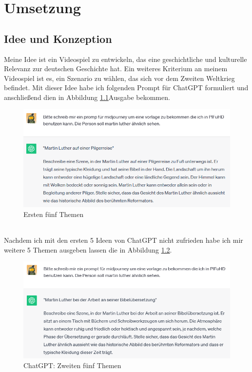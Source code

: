 \chapter{Umsetzung}
\section {Idee und Konzeption}
Meine Idee ist ein Videospiel zu entwickeln, das eine geschichtliche und kulturelle Relevanz zur deutschen Geschichte hat. Ein weiteres Kriterium an meinem Videospiel ist es, ein Szenario zu wählen, das sich vor dem Zweiten Weltkrieg befindet. Mit dieser Idee habe ich folgenden Prompt für ChatGPT formuliert und anschließend dien in Abbildung \ref{ersten-5-themen}Ausgabe bekommen.
\begin{figure}[h]
   		 \centering
\includegraphics[width=14cm]{BilderFuerBA/01.png}
   		 \caption{Ersten fünf Themen}
   		 \label{ersten-5-themen}
\end{figure}
\\
Nachdem ich mit den ersten 5 Ideen von ChatGPT nicht zufrieden habe ich mir weitere 5 Themen ausgeben lassen die in Abbildung \ref{zweiten-5-themen}.
\begin{figure}[h]
   		 \centering
\includegraphics[width=14cm]{BilderFuerBA/02.png}
   		 \caption{ChatGPT: Zweiten fünf Themen}
   		 \label{zweiten-5-themen}
\end{figure}

